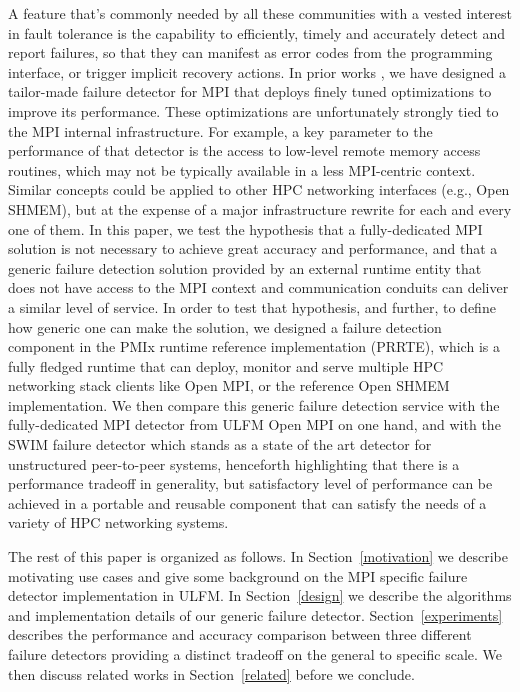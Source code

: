 \documentclass[sigconf]{acmart}
\begin{document}
A feature that's commonly needed by all these communities with a vested
interest in fault tolerance is the capability to efficiently, timely and
accurately detect and report failures, so that they can manifest as
error codes from the programming interface, or trigger implicit recovery
actions. In prior works \cite{George16}, we have designed a tailor-made
failure detector for MPI that deploys finely tuned optimizations to
improve its performance. These optimizations are unfortunately strongly
tied to the MPI internal infrastructure. For example, a key parameter to 
the performance of that detector is the
access to low-level remote memory access routines, which may not be typically
available in a less MPI-centric context. Similar concepts could be
applied to other HPC networking interfaces (e.g., Open SHMEM), but at 
the expense of a major infrastructure rewrite for each and every one of 
them. In this paper, we test the hypothesis that a fully-dedicated MPI 
solution is not necessary to achieve great accuracy and performance, and 
that a generic failure detection solution provided by an external runtime 
entity that does not have access to the MPI context and communication conduits
can deliver a similar level of service. In order to test that hypothesis, 
and further, to define how generic one can make the solution, we designed 
a failure detection component in the PMIx \cite{CASTAIN18} runtime reference implementation
(PRRTE), which is a fully fledged runtime that can deploy, monitor and 
serve multiple HPC networking stack clients like Open MPI, or the 
reference Open SHMEM implementation. We then compare this generic 
failure detection service with the fully-dedicated MPI detector from 
ULFM Open MPI on one hand, and with the SWIM failure detector which stands 
as a state of the art detector for unstructured peer-to-peer systems, henceforth 
highlighting that there is a performance tradeoff in generality, but 
satisfactory level of performance can be achieved in a portable and reusable 
component that can satisfy the needs of a variety of HPC networking systems. 


The rest of this paper is organized as follows. In Section~\ref{motivation}
we describe motivating use cases and give some background on the MPI specific 
failure detector implementation in ULFM. In Section~\ref{design} we describe 
the algorithms and implementation details of our generic failure detector.
Section~\ref{experiments} describes the performance and accuracy comparison
between three different failure detectors providing a distinct tradeoff 
on the general to specific scale. We then discuss related works in 
Section~\ref{related} before we conclude.
\end{document}
